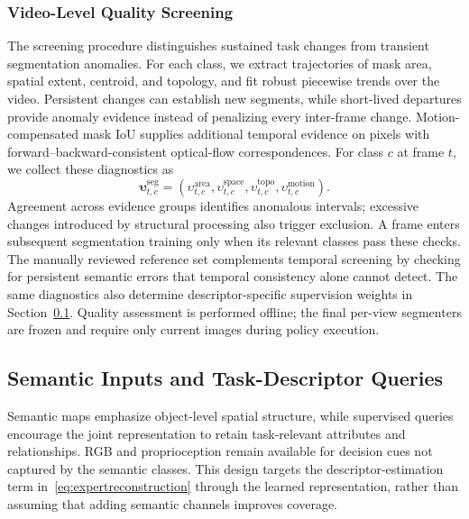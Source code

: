 \subsubsection{Video-Level Quality Screening}
The screening procedure distinguishes sustained task changes from transient segmentation anomalies.
For each class, we extract trajectories of mask area, spatial extent, centroid, and topology, and fit robust piecewise trends over the video.
Persistent changes can establish new segments, while short-lived departures provide anomaly evidence instead of penalizing every inter-frame change.
Motion-compensated mask IoU supplies additional temporal evidence on pixels with forward--backward-consistent optical-flow correspondences.
For class $c$ at frame $t$, we collect these diagnostics as
\begin{equation}
 \bm\upsilon_{t,c}^{\mathrm{seg}}
 =(\upsilon_{t,c}^{\mathrm{area}},
   \upsilon_{t,c}^{\mathrm{space}},
   \upsilon_{t,c}^{\mathrm{topo}},
   \upsilon_{t,c}^{\mathrm{motion}}).
 \label{eq:segevidence}
\end{equation}
Agreement across evidence groups identifies anomalous intervals; excessive changes introduced by structural processing also trigger exclusion.
A frame enters subsequent segmentation training only when its relevant classes pass these checks.
The manually reviewed reference set complements temporal screening by checking for persistent semantic errors that temporal consistency alone cannot detect.
The same diagnostics also determine descriptor-specific supervision weights in Section~\ref{sec:methodrelations}.
Quality assessment is performed offline; the final per-view segmenters are frozen and require only current images during policy execution.

\subsection{Semantic Inputs and Task-Descriptor Queries}
\label{sec:methodrelations}
Semantic maps emphasize object-level spatial structure, while supervised queries encourage the joint representation to retain task-relevant attributes and relationships.
RGB and proprioception remain available for decision cues not captured by the semantic classes.
This design targets the descriptor-estimation term in~\eqref{eq:expertreconstruction} through the learned representation, rather than assuming that adding semantic channels improves coverage.

